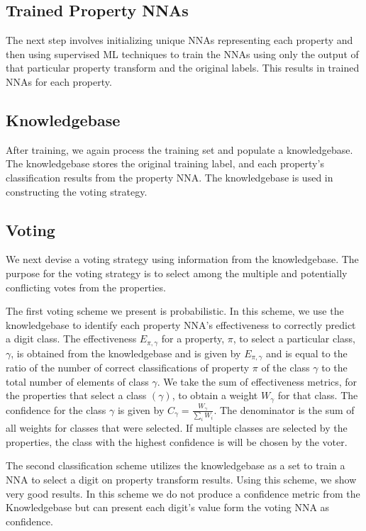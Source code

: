 \documentclass[conference]{IEEEtran}
\begin{document}
\subsection{Trained Property NNAs}
The next step involves initializing unique NNAs representing each property and then using supervised ML techniques to train the NNAs using only the output of that particular property transform and the original labels.  This results in trained NNAs for each property.

\subsection{Knowledgebase}
After training, we again process the training set and populate a knowledgebase.  The knowledgebase stores the original training label, and each property's classification results from the property NNA.  The knowledgebase is used in constructing the voting strategy. 

\subsection{Voting}
We next devise a voting strategy using information from the knowledgebase.  The purpose for the voting strategy is to select among the multiple and potentially conflicting votes from the properties.

The first voting scheme we present is probabilistic.  In this scheme, we use the knowledgebase to identify each property NNA's effectiveness to correctly predict a digit class.   The effectiveness $E_{\pi,\gamma}$ for a property, $\pi$, to select a particular class, $\gamma$,  is obtained from the knowledgebase and is given by $E_{\pi,\gamma}$ and is equal to the ratio of the number of correct classifications of property $\pi$ of the class $\gamma$ to the total number of elements of class $\gamma$.   We take the sum of effectiveness metrics, for the properties that select a class $(\gamma)$, to obtain a weight $W_\gamma$ for that class.  The confidence for the class $\gamma$ is given by $C_\gamma=\frac{W_\gamma}{\sum\limits_iW_i}$.  The denominator is the sum of all weights for classes that were selected.  If multiple classes are selected by the properties, the class with the highest confidence is will be chosen by the voter.

The second classification scheme utilizes the knowledgebase as a set to train a NNA to select a digit on property transform results.  Using this scheme, we show very good results.  In this scheme we do not produce a confidence metric from the Knowledgebase but can present each digit's value form the voting NNA as confidence.
\end{document}
